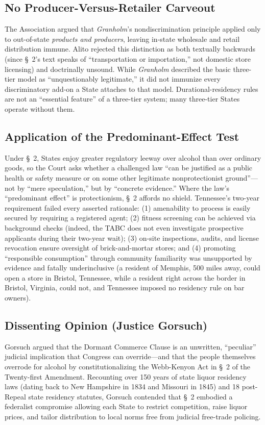 \documentclass[12pt]{article}
\begin{document}
\subsection{No Producer-Versus-Retailer Carveout}
The Association argued that \textit{Granholm}'s nondiscrimination principle applied only to out-of-state \textit{products and producers}, leaving in-state wholesale and retail distribution immune. Alito rejected this distinction as both textually backwards (since \S~2's text speaks of ``transportation or importation,'' not domestic store licensing) and doctrinally unsound. While \textit{Granholm} described the basic three-tier model as ``unquestionably legitimate,'' it did not immunize every discriminatory add-on a State attaches to that model. Durational-residency rules are not an ``essential feature'' of a three-tier system; many three-tier States operate without them.

\subsection{Application of the Predominant-Effect Test}
Under \S~2, States enjoy greater regulatory leeway over alcohol than over ordinary goods, so the Court asks whether a challenged law ``can be justified as a public health or safety measure or on some other legitimate nonprotectionist ground''---not by ``mere speculation,'' but by ``concrete evidence.'' Where the law's ``predominant effect'' is protectionism, \S~2 affords no shield. Tennessee's two-year requirement failed every asserted rationale: (1) amenability to process is easily secured by requiring a registered agent; (2) fitness screening can be achieved via background checks (indeed, the TABC does not even investigate prospective applicants during their two-year wait); (3) on-site inspections, audits, and license revocation ensure oversight of brick-and-mortar stores; and (4) promoting ``responsible consumption'' through community familiarity was unsupported by evidence and fatally underinclusive (a resident of Memphis, 500 miles away, could open a store in Bristol, Tennessee, while a resident right across the border in Bristol, Virginia, could not, and Tennessee imposed no residency rule on bar owners).

\subsection{Dissenting Opinion (Justice Gorsuch)}

Gorsuch argued that the Dormant Commerce Clause is an unwritten, ``peculiar'' judicial implication that Congress can override---and that the people themselves overrode for alcohol by constitutionalizing the Webb-Kenyon Act in \S~2 of the Twenty-first Amendment. Recounting over 150 years of state liquor residency laws (dating back to New Hampshire in 1834 and Missouri in 1845) and 18 post-Repeal state residency statutes, Gorsuch contended that \S~2 embodied a federalist compromise allowing each State to restrict competition, raise liquor prices, and tailor distribution to local norms free from judicial free-trade policing.
\end{document}
